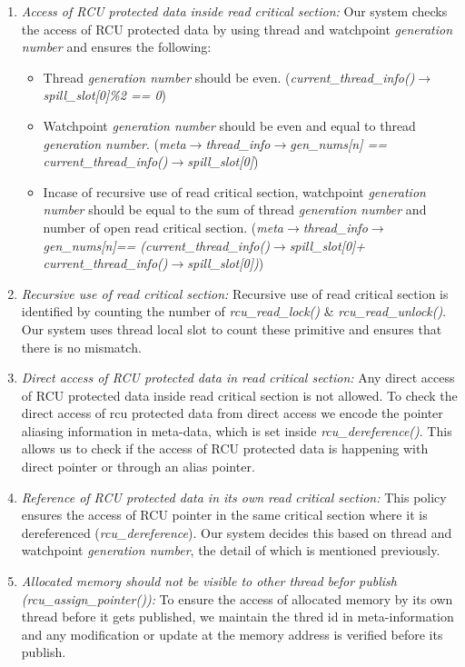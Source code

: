 \begin {enumerate} 
	\item[i)] \emph{Access of RCU protected data inside read critical section:} Our system checks the access of RCU protected data by using thread and watchpoint \emph{generation number} and ensures the following:%
	\begin {itemize}
		\item Thread \emph{generation number} should be even. (\emph{current\_thread\_info()$\rightarrow$spill\_slot[0]\%2 == 0})
		\item Watchpoint \emph{generation number} should be even and equal to thread \emph{generation number}. (\emph{meta$\rightarrow$thread\_info$\rightarrow$gen\_nums[n] == current\_thread\_info()$\rightarrow$spill\_slot[0]}) 
		\item Incase of recursive use of read critical section, watchpoint \emph{generation number} should be equal to the sum of thread \emph{generation number} and number of open read critical section. (\emph{meta$\rightarrow$thread\_info$\rightarrow$gen\_nums[n]== (current\_thread\_info()$\rightarrow$spill\_slot[0]+ current\_thread\_info()$\rightarrow$spill\_slot[0])})
	\end{itemize}	  

	\item[ii)] \emph{Recursive use of read critical section:} Recursive use of read critical section is identified by counting the number of  \emph{rcu\_read\_lock()}  \& \emph{rcu\_read\_unlock()}. Our system uses thread local slot to count these primitive and ensures that there is no mismatch.

	\item[iii)] \emph{ Direct access of RCU protected data in read critical section:} Any direct access of RCU protected data inside read critical section is not allowed. To check the direct access of rcu protected data from direct access we encode the pointer aliasing information in meta-data, which is set inside \emph{rcu\_dereference()}. This allows us to check if the access of RCU protected data is happening with direct pointer or through an alias pointer.

	\item[iv)] \emph{ Reference of RCU protected data in its own read critical section:} This policy ensures the access of RCU pointer in the same critical section where it is dereferenced (\emph{rcu\_dereference}). Our system decides this based on thread and watchpoint \emph{generation number}, the detail of which is mentioned previously.  

	\item[v)] \emph{ Allocated memory should not be visible to other thread befor publish (\emph{rcu\_assign\_pointer()}):} To ensure the access of allocated memory by its own thread before it gets published, we maintain the thred id in meta-information and any modification or update at the memory address is verified before its publish.
\end{enumerate}

